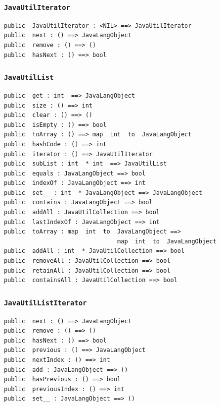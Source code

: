 \documentclass[\pformat,12pt]{article}
\begin{document}
\subsubsection{\texttt{JavaUtilIterator}}
\begin{small}
\begin{verbatim}
public  JavaUtilIterator : <NIL> ==> JavaUtilIterator
public  next : () ==> JavaLangObject
public  remove : () ==> ()
public  hasNext : () ==> bool
\end{verbatim}
\end{small}

\subsubsection{\texttt{JavaUtilList}}
\begin{small}
\begin{verbatim}
public  get : int  ==> JavaLangObject
public  size : () ==> int
public  clear : () ==> ()
public  isEmpty : () ==> bool
public  toArray : () ==> map  int  to  JavaLangObject
public  hashCode : () ==> int
public  iterator : () ==> JavaUtilIterator
public  subList : int  * int  ==> JavaUtilList
public  equals : JavaLangObject ==> bool
public  indexOf : JavaLangObject ==> int
public  set__ : int  * JavaLangObject ==> JavaLangObject
public  contains : JavaLangObject ==> bool
public  addAll : JavaUtilCollection ==> bool
public  lastIndexOf : JavaLangObject ==> int
public  toArray : map  int  to  JavaLangObject ==> 
                                map  int  to  JavaLangObject
public  addAll : int  * JavaUtilCollection ==> bool
public  removeAll : JavaUtilCollection ==> bool
public  retainAll : JavaUtilCollection ==> bool
public  containsAll : JavaUtilCollection ==> bool
\end{verbatim}
\end{small}

\subsubsection{\texttt{JavaUtilListIterator}}
\begin{small}
\begin{verbatim}
public  next : () ==> JavaLangObject
public  remove : () ==> ()
public  hasNext : () ==> bool
public  previous : () ==> JavaLangObject
public  nextIndex : () ==> int
public  add : JavaLangObject ==> ()
public  hasPrevious : () ==> bool
public  previousIndex : () ==> int
public  set__ : JavaLangObject ==> ()
\end{verbatim}
\end{small}
\end{document}
